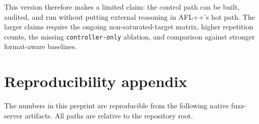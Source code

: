 \documentclass[11pt]{article}
\begin{document}
This version therefore makes a limited claim: the control path can be
built, audited, and run without putting external reasoning in AFL++'s
hot path. The larger claims require the ongoing non-saturated-target
matrix, higher repetition counts, the missing \texttt{controller-only}
ablation, and comparison against stronger format-aware baselines.

\section*{Reproducibility appendix}
\label{sec:repro}

The numbers in this preprint are reproducible from the following
native fuzz-server artifacts. All paths are relative to the repository
root.
\end{document}
